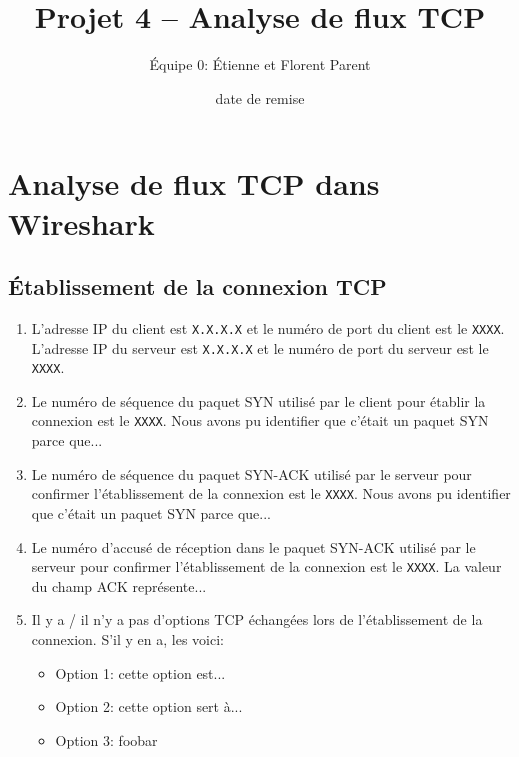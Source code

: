 \documentclass[]{article}
\title{Projet 4 -- Analyse de flux TCP}
\author{Équipe 0: Étienne et Florent Parent} %
\date{date de remise} %
\begin{document}
\maketitle

\section*{Analyse de flux TCP dans Wireshark}

\subsection*{Établissement de la connexion TCP}

\begin{enumerate}
      \item L'adresse IP du client est \texttt{X.X.X.X} et le numéro de port du client est le
            \texttt{XXXX}. L'adresse IP du serveur est \texttt{X.X.X.X} et le numéro de port du
            serveur est le \texttt{XXXX}.
      \item Le numéro de séquence du paquet SYN utilisé par le client pour établir la connexion
            est le \texttt{XXXX}. Nous avons pu identifier que c'était un paquet SYN parce que...
      \item Le numéro de séquence du paquet SYN-ACK utilisé par le serveur pour confirmer l'établissement
            de la connexion est le \texttt{XXXX}. Nous avons pu identifier que c'était un paquet SYN parce que...
      \item Le numéro d'accusé de réception dans le paquet SYN-ACK utilisé par le serveur pour confirmer
            l'établissement de la connexion est le \texttt{XXXX}. La valeur du champ ACK représente...

      \item Il y a / il n'y a pas d'options TCP échangées lors de l'établissement de la connexion. S'il
            y en a, les voici:
            \begin{itemize}
                  \item Option 1: cette option est...
                  \item Option 2: cette option sert à...
                  \item Option 3: foobar
            \end{itemize}
      

\end{enumerate}
\end{document}
